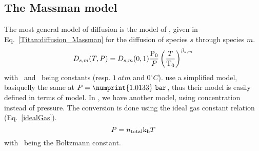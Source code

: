 \subsection{The Massman model}

The most general model of diffusion is the model of \citet{Massman1998}, given
in Eq.~\ref{Titan:diffusion_Massman} for the diffusion of species $s$ through
species $m$.
\begin{equation}
D_{s,m}(T,P) = D_{s,m}(0,1) \frac{\mathrm{P_0}}{P}\left(\frac{T}{\mathrm{T_0}}\right)^{\beta_{s,m}}
\label{Titan:diffusion_Massman}
\end{equation}
with \Pz\ and \Tz\ being constants (resp. $1~\unit{atm}$ and $0\unit{^\circ C}$).
\citet{Wakeham1973} use a simplified model, basiquelly the same at $P=\numprint{1.0133}~\unit{bar}$, thus
their model is easily defined in terms of \citet{Massman1998} model. In \citet{WilsonPhD,Haye2005},
we have another model, using concentration instead of pressure. The conversion is done
using the ideal gas constant relation (Eq.~\ref{idealGas}).
\begin{equation}
P = n_\text{total}\text{k}_\text{b} T
\label{idealGas}
\end{equation}
with \kb\ being the Boltzmann constant.

